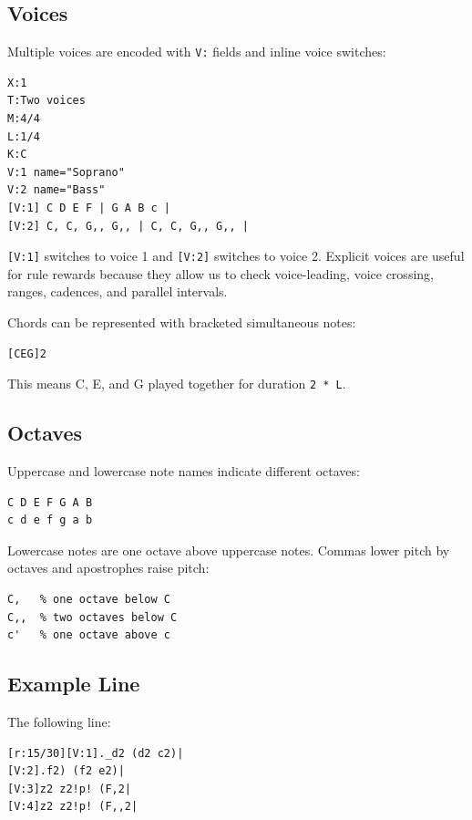 \documentclass[11pt]{article}
\begin{document}
\subsection{Voices}

Multiple voices are encoded with \verb|V:| fields and inline voice switches:

\begin{verbatim}
X:1
T:Two voices
M:4/4
L:1/4
K:C
V:1 name="Soprano"
V:2 name="Bass"
[V:1] C D E F | G A B c |
[V:2] C, C, G,, G,, | C, C, G,, G,, |
\end{verbatim}

\verb|[V:1]| switches to voice 1 and \verb|[V:2]| switches to voice 2.
Explicit voices are useful for rule rewards because they allow us to check
voice-leading, voice crossing, ranges, cadences, and parallel intervals.

Chords can be represented with bracketed simultaneous notes:

\begin{verbatim}
[CEG]2
\end{verbatim}

This means C, E, and G played together for duration \verb|2 * L|.

\subsection{Octaves}

Uppercase and lowercase note names indicate different octaves:

\begin{verbatim}
C D E F G A B
c d e f g a b
\end{verbatim}

Lowercase notes are one octave above uppercase notes. Commas lower pitch by
octaves and apostrophes raise pitch:

\begin{verbatim}
C,   % one octave below C
C,,  % two octaves below C
c'   % one octave above c
\end{verbatim}

\subsection{Example Line}

The following line:

\begin{verbatim}
[r:15/30][V:1]._d2 (d2 c2)|
[V:2].f2) (f2 e2)|
[V:3]z2 z2!p! (F,2|
[V:4]z2 z2!p! (F,,2|
\end{verbatim}
\end{document}
